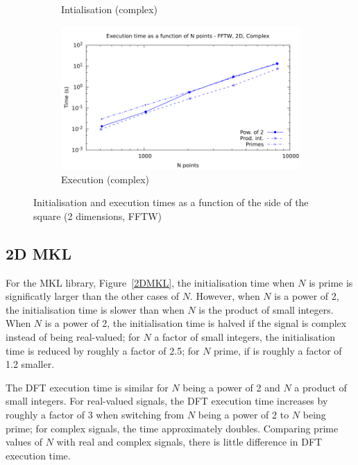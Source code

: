 \documentclass[12pt, a4paper]{article}
\begin{document}
\begin{figure}[H]
\begin{subfigure}{.5\textwidth}
\caption{Intialisation (complex)}
\label{2DFFTWCI}
\end{subfigure}%
\begin{subfigure}{.5\textwidth}
\centering
\includegraphics[width=.9\linewidth]{graphs/2d-fftw-exec-c.pdf}
\caption{Execution (complex)}
\label{2DFFTWC}
\end{subfigure}
\caption{Initialisation and execution times as a function of the side of the square (2 dimensions, FFTW)}
\label{2DFFTW}
\end{figure}



\subsection{2D MKL}
For the MKL library, Figure~\ref{2DMKL}, the initialisation time when $N$ is prime is significatly larger than the other cases of $N.$ However, when $N$ is a power of 2, the initialisation time is slower than when $N$ is the product of small integers. When $N$ is a power of 2, the initialisation time is halved if the signal is complex instead of being real-valued; for $N$ a factor of small integers, the initialisation time is reduced by roughly a factor of 2.5; for $N$ prime, if is roughly a factor of 1.2 smaller. 

The DFT execution time is similar for $N$ being a power of 2 and $N$ a product of small integers. For real-valued signals, the DFT execution time increases by roughly a factor of 3 when switching from $N$ being a power of 2 to $N$ being prime; for complex signals, the time approximately doubles. Comparing prime values of $N$ with real and complex signals, there is little difference in DFT execution time.
\end{document}
